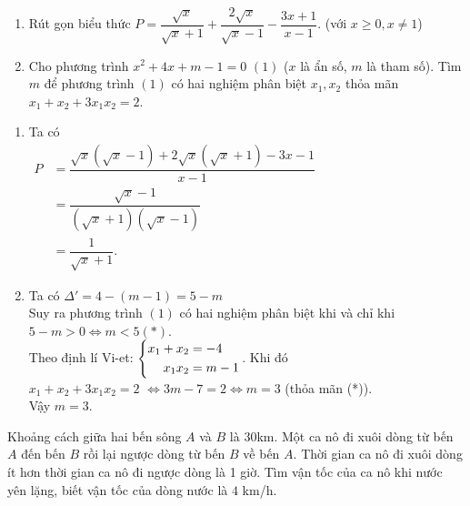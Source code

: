 \begin{ex}%
\hfill
    \begin{enumerate}    
        \item Rút gọn biểu thức $P=\dfrac{\sqrt{x}}{\sqrt{x}+1}+\dfrac{2\sqrt{x}}{\sqrt{x}-1}-\dfrac{3x+1}{x-1}$. (với $x \geq 0, x\ne 1$)
        \item Cho phương trình $x^2+4x+m-1=0 \,\,(1)$  ($x$ là ẩn số, $m$ là tham số). Tìm $m$ để phương trình $(1)$ có hai nghiệm phân biệt $x_1,x_2$ thỏa mãn $x_1+x_2+3x_1x_2=2$.
    \end{enumerate}
\loigiai
    {
    \begin{enumerate}
        \item Ta có \\
        $
        \begin{aligned}
        P&=\dfrac{\sqrt{x}\left(\sqrt{x}-1\right)+2\sqrt{x}\left(\sqrt{x}+1\right)-3x-1}{x-1}\\
        &=\dfrac{\sqrt{x}-1}{\left(\sqrt{x}+1\right)\left(\sqrt{x}-1\right)}\\
        &=\dfrac{1}{\sqrt{x}+1}.
        \end{aligned}
        $
        \item Ta có  $\Delta'=4-(m-1)=5-m$ \\
     Suy ra phương trình $(1)$ có hai nghiệm phân biệt khi và chỉ khi  $5-m>0 \Leftrightarrow m<5 (*)$.\\
       Theo định lí Vi-et: $\left\{\begin{aligned} x_1+x_2&=-4 \\ x_1x_2&=m-1\end{aligned}\right.$. Khi đó \\
$x_1+x_2+3x_1x_2=2$     
       $\Leftrightarrow 3m-7=2 \Leftrightarrow m=3$  (thỏa mãn (*)).\\
        Vậy $m=3$.
    \end{enumerate}
    }
\end{ex}
\begin{ex}%
Khoảng cách giữa hai bến sông $A$ và $B$ là $30$km. Một ca nô đi xuôi dòng từ bến $A$ đến bến $B$ rồi lại  ngược dòng  từ bến $B$ về bến $A$. Thời gian ca nô đi xuôi dòng ít hơn thời gian ca nô đi ngược dòng là 1 giờ. Tìm vận tốc của ca nô khi nước yên lặng, biết vận tốc của dòng nước là $4$ km/h.
\end{ex}
